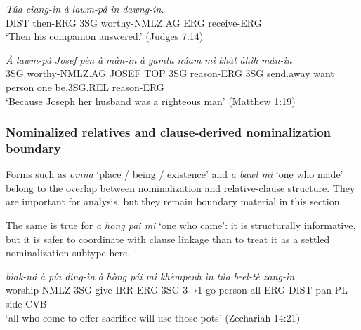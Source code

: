 \documentclass[
  11pt,
  a4paper,
]{article}
\newcommand{\tdim}[1]{\textit{#1}}
\newcommand{\tdimword}[1]{\textit{#1}}
\renewcommand{\textsc}[1]{{\footnotesize\MakeUppercase{#1}}}
\newcommand{\glossquote}[1]{`#1'}
\begin{document}
\begin{exe}
\ex \label{ex:nmlz-lawmpa-judg7}
\gll \tdimword{Túa} \tdimword{cìang-ìn} \tdimword{à} \tdimword{lawm-pá} \tdimword{ìn} \tdimword{dawng-ìn.} \\
     \textsc{dist} then-\textsc{erg} \textsc{3sg} worthy-\textsc{nmlz}.\textsc{ag} \textsc{erg} receive-\textsc{erg} \\
\glt \glossquote{Then his companion answered.} (Judges 7:14)
\end{exe}

\begin{exe}
\ex \label{ex:nmlz-lawmpa-matt1}
\gll \tdimword{À} \tdimword{lawm-pá} \tdimword{Josef} \tdimword{pèn} \tdimword{à} \tdimword{màn-ìn} \tdimword{à} \tdimword{gamta} \tdimword{núam} \tdimword{mì} \tdimword{khàt} \tdimword{àhìh} \tdimword{màn-ìn} \\
     \textsc{3sg} worthy-\textsc{nmlz}.\textsc{ag} \textsc{josef} \textsc{top} \textsc{3sg} reason-\textsc{erg} \textsc{3sg} send.away want person one be.\textsc{3sg}.\textsc{rel} reason-\textsc{erg} \\
\glt \glossquote{Because Joseph her husband was a righteous man} (Matthew 1:19)
\end{exe}

\subsubsection{Nominalized relatives and clause-derived nominalization
boundary}\label{nominalized-relatives-and-clause-derived-nominalization-boundary}

Forms such as \tdim{omna} \glossquote{place / being / existence} and
\tdim{a bawl mi} \glossquote{one who made} belong to the overlap between
nominalization and relative-clause structure. They are important for
analysis, but they remain boundary material in this section.

The same is true for \tdim{a hong pai mi} \glossquote{one who came}: it
is structurally informative, but it is safer to coordinate with clause
linkage than to treat it as a settled nominalization subtype here.

\begin{exe}
\ex \label{ex:nmlz-hong-pai-mi-zech14}
\gll \tdimword{bìak-ná} \tdimword{à} \tdimword{pía} \tdimword{dìng-ìn} \tdimword{à} \tdimword{hòng} \tdimword{pái} \tdimword{mì} \tdimword{khèmpeuh} \tdimword{ìn} \tdimword{túa} \tdimword{beel-tè} \tdimword{zang-ìn} \\
     worship-\textsc{nmlz} \textsc{3sg} give \textsc{irr}-\textsc{erg} \textsc{3sg} \textsc{3→1} go person all \textsc{erg} \textsc{dist} pan-\textsc{pl} side-\textsc{cvb} \\
\glt \glossquote{all who come to offer sacrifice will use those pots} (Zechariah 14:21)
\end{exe}
\end{document}
